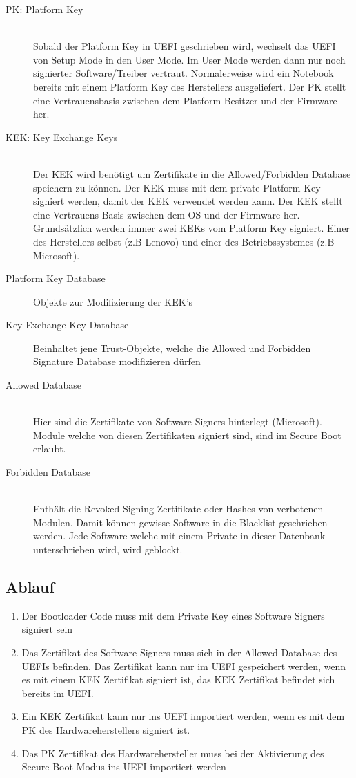 \begin{description}
	\item[PK: Platform Key]  \hfill \\
	Sobald der Platform Key in UEFI geschrieben wird, wechselt das UEFI von Setup Mode in den User Mode. Im User Mode werden dann nur noch signierter Software/Treiber vertraut. Normalerweise wird ein Notebook bereits mit einem Platform Key des Herstellers ausgeliefert. Der PK stellt eine Vertrauensbasis zwischen dem Platform Besitzer und der Firmware her.
	\item[KEK: Key Exchange Keys] \hfill \\
	Der KEK wird benötigt um Zertifikate in die Allowed/Forbidden Database speichern zu können. Der KEK muss mit dem private Platform Key signiert werden, damit der KEK verwendet werden kann. Der KEK stellt eine Vertrauens Basis zwischen dem OS und der Firmware her. Grundsätzlich werden immer zwei KEKs vom Platform Key signiert. Einer des Herstellers selbst (z.B Lenovo) und einer des Betriebssystemes (z.B Microsoft).
	\item[Platform Key Database] Objekte zur Modifizierung der KEK's
	\item[Key Exchange Key Database] Beinhaltet jene Trust-Objekte, welche die Allowed und Forbidden Signature Database modifizieren dürfen	
	\item[Allowed Database] \hfill \\
	Hier sind die Zertifikate von Software Signers hinterlegt (Microsoft). Module welche von diesen Zertifikaten signiert sind, sind im Secure Boot erlaubt. 
	\item[Forbidden Database] \hfill \\
	Enthält die Revoked Signing Zertifikate oder Hashes von verbotenen Modulen. Damit können gewisse Software in die Blacklist geschrieben werden. Jede Software welche mit einem Private in dieser Datenbank unterschrieben wird, wird geblockt.
\end{description}

\subsection{Ablauf}
\begin{enumerate}
	\item Der Bootloader Code muss mit dem Private Key eines Software Signers signiert sein
	\item Das Zertifikat des Software Signers muss sich in der Allowed Database des UEFIs befinden. Das Zertifikat kann nur im UEFI gespeichert werden, wenn es mit einem KEK Zertifikat signiert ist, das KEK Zertifikat befindet sich bereits im UEFI. 
	\item Ein KEK Zertifikat kann nur ins UEFI importiert werden, wenn es mit dem PK des Hardwareherstellers signiert ist.
	\item Das PK Zertifikat des Hardwarehersteller muss bei der Aktivierung des Secure Boot Modus ins UEFI importiert werden
\end{enumerate}


